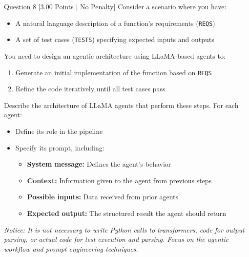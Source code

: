 \documentclass[11pt,a4paper]{article}
\begin{document}
\begin{questionbox}{Question 8 \hfill [3.00 Points $\vert$ No Penalty]}
Consider a scenario where you have:
\begin{itemize}[leftmargin=1.5em]
    \item A natural language description of a function's requirements (\texttt{REQS})
    \item A set of test cases (\texttt{TESTS}) specifying expected inputs and outputs
\end{itemize}
You need to design an agentic architecture using LLaMA-based agents to:
\begin{enumerate}[label=\arabic*.,leftmargin=1.5em]
    \item Generate an initial implementation of the function based on \texttt{REQS}
    \item Refine the code iteratively until all test cases pass
\end{enumerate}
Describe the architecture of LLaMA agents that perform these steps. For each agent:
\begin{itemize}[leftmargin=1.5em]
    \item Define its role in the pipeline
    \item Specify its prompt, including:
    \begin{itemize}[leftmargin=1.2em]
        \item \textbf{System message:} Defines the agent's behavior
        \item \textbf{Context:} Information given to the agent from previous steps
        \item \textbf{Possible inputs:} Data received from prior agents
        \item \textbf{Expected output:} The structured result the agent should return
    \end{itemize}
\end{itemize}
\textit{Notice: It is not necessary to write Python calls to transformers, code for output parsing, or actual code for test execution and parsing. Focus on the agentic workflow and prompt engineering techniques.}
\end{questionbox}
\end{document}
